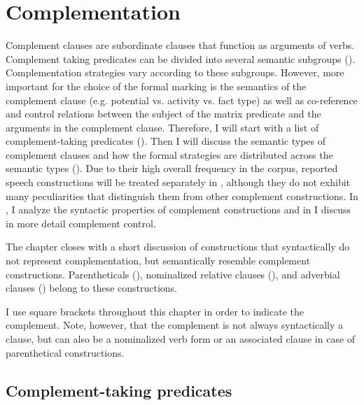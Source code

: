 \chapter{Complementation}
\label{cpt:Complementation}

Complement clauses are subordinate clauses that function as arguments of verbs. Complement taking predicates can be divided into several semantic subgroups (). Complementation strategies vary according to these subgroups. However, more important for the choice of the formal marking is the semantics of the complement clause (e.g. potential vs. activity vs. fact type) as well as co-reference and control relations between the subject of the matrix predicate and the arguments in the complement clause. Therefore, I will start with a list of complement-taking predicates (). Then I will discuss the semantic types of complement clauses and how the formal strategies are distributed across the semantic types (). Due to their high overall frequency in the corpus, reported speech constructions will be treated separately in , although they do not exhibit many peculiarities that distinguish them from other complement constructions. In , I analyze the syntactic properties of complement constructions and in  I discuss in more detail complement control. 

The chapter closes with a short discussion of constructions that syntactically do not represent complementation, but semantically resemble complement constructions. Parentheticals (), nominalized relative clauses (), and adverbial clauses () belong to these constructions.

I use square brackets throughout this chapter in order to indicate the complement. Note, however, that the complement is not always syntactically a clause, but can also be a nominalized verb form or an associated clause in case of parenthetical constructions.



\section{Complement-taking predicates}
\label{sec:Complement-taking predicates}

